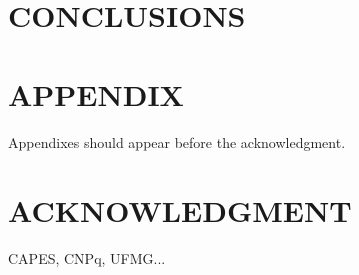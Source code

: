 \documentclass[letterpaper, 10 pt, conference]{ieeeconf}  %
\begin{document}
\section{CONCLUSIONS}
%


\section*{APPENDIX}

Appendixes should appear before the acknowledgment.

\section*{ACKNOWLEDGMENT}

CAPES, CNPq, UFMG...





 
\end{document}
